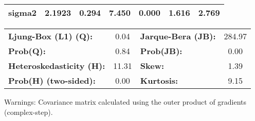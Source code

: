 \documentclass{article}%
\begin{document}
\begin{center}
\begin{tabular}{lcccccc}
\textbf{sigma2} &       2.1923  &        0.294     &     7.450  &         0.000        &        1.616    &        2.769     \\
\bottomrule
\end{tabular}
\begin{tabular}{lclc}
\textbf{Ljung-Box (L1) (Q):}     &  0.04 & \textbf{  Jarque-Bera (JB):  } & 284.97  \\
\textbf{Prob(Q):}                &  0.84 & \textbf{  Prob(JB):          } &  0.00   \\
\textbf{Heteroskedasticity (H):} & 11.31 & \textbf{  Skew:              } &  1.39   \\
\textbf{Prob(H) (two-sided):}    &  0.00 & \textbf{  Kurtosis:          } &  9.15   \\
\bottomrule
\end{tabular}
\end{center}

Warnings: \newline
 [1] Covariance matrix calculated using the outer product of gradients (complex-step).%
\end{document}
